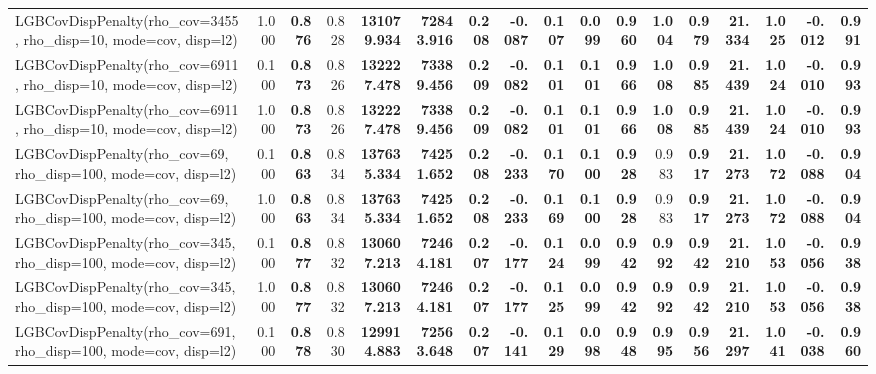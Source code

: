 \documentclass[11pt]{article}
\theoremstyle{plain}
\theoremstyle{definition}
\newcommand{\1}{\mathbf{1}}
\begin{document}
\begin{table}[htbp]
{\begin{tabular}{lrrrrrrrrrrrrrrrr}
LGBCovDispPenalty(rho_cov=3455, rho_disp=10, mode=cov, disp=l2) & 1.000 & \textbf{0.876} & 0.828 & \textbf{131079.934} & \textbf{72843.916} & \textbf{0.208} & \textbf{-0.087} & \textbf{0.107} & \textbf{0.099} & \textbf{0.960} & \textbf{1.004} & \textbf{0.979} & \textbf{21.334} & \textbf{1.025} & \textbf{-0.012} & \textbf{0.991} \\
LGBCovDispPenalty(rho_cov=6911, rho_disp=10, mode=cov, disp=l2) & 0.100 & \textbf{0.873} & 0.826 & \textbf{132227.478} & \textbf{73389.456} & \textbf{0.209} & \textbf{-0.082} & \textbf{0.101} & \textbf{0.101} & \textbf{0.966} & \textbf{1.008} & \textbf{0.985} & \textbf{21.439} & \textbf{1.024} & \textbf{-0.010} & \textbf{0.993} \\
LGBCovDispPenalty(rho_cov=6911, rho_disp=10, mode=cov, disp=l2) & 1.000 & \textbf{0.873} & 0.826 & \textbf{132227.478} & \textbf{73389.456} & \textbf{0.209} & \textbf{-0.082} & \textbf{0.101} & \textbf{0.101} & \textbf{0.966} & \textbf{1.008} & \textbf{0.985} & \textbf{21.439} & \textbf{1.024} & \textbf{-0.010} & \textbf{0.993} \\
LGBCovDispPenalty(rho_cov=69, rho_disp=100, mode=cov, disp=l2) & 0.100 & \textbf{0.863} & 0.834 & \textbf{137635.334} & \textbf{74251.652} & \textbf{0.208} & \textbf{-0.233} & \textbf{0.170} & \textbf{0.100} & \textbf{0.928} & 0.983 & \textbf{0.917} & \textbf{21.273} & \textbf{1.072} & \textbf{-0.088} & \textbf{0.904} \\
LGBCovDispPenalty(rho_cov=69, rho_disp=100, mode=cov, disp=l2) & 1.000 & \textbf{0.863} & 0.834 & \textbf{137635.334} & \textbf{74251.652} & \textbf{0.208} & \textbf{-0.233} & \textbf{0.169} & \textbf{0.100} & \textbf{0.928} & 0.983 & \textbf{0.917} & \textbf{21.273} & \textbf{1.072} & \textbf{-0.088} & \textbf{0.904} \\
LGBCovDispPenalty(rho_cov=345, rho_disp=100, mode=cov, disp=l2) & 0.100 & \textbf{0.877} & 0.832 & \textbf{130607.213} & \textbf{72464.181} & \textbf{0.207} & \textbf{-0.177} & \textbf{0.124} & \textbf{0.099} & \textbf{0.942} & \textbf{0.992} & \textbf{0.942} & \textbf{21.210} & \textbf{1.053} & \textbf{-0.056} & \textbf{0.938} \\
LGBCovDispPenalty(rho_cov=345, rho_disp=100, mode=cov, disp=l2) & 1.000 & \textbf{0.877} & 0.832 & \textbf{130607.213} & \textbf{72464.181} & \textbf{0.207} & \textbf{-0.177} & \textbf{0.125} & \textbf{0.099} & \textbf{0.942} & \textbf{0.992} & \textbf{0.942} & \textbf{21.210} & \textbf{1.053} & \textbf{-0.056} & \textbf{0.938} \\
LGBCovDispPenalty(rho_cov=691, rho_disp=100, mode=cov, disp=l2) & 0.100 & \textbf{0.878} & 0.830 & \textbf{129914.883} & \textbf{72563.648} & \textbf{0.207} & \textbf{-0.141} & \textbf{0.129} & \textbf{0.098} & \textbf{0.948} & \textbf{0.995} & \textbf{0.956} & \textbf{21.297} & \textbf{1.041} & \textbf{-0.038} & \textbf{0.960} \\

\end{tabular}}
\end{table}
\end{document}
